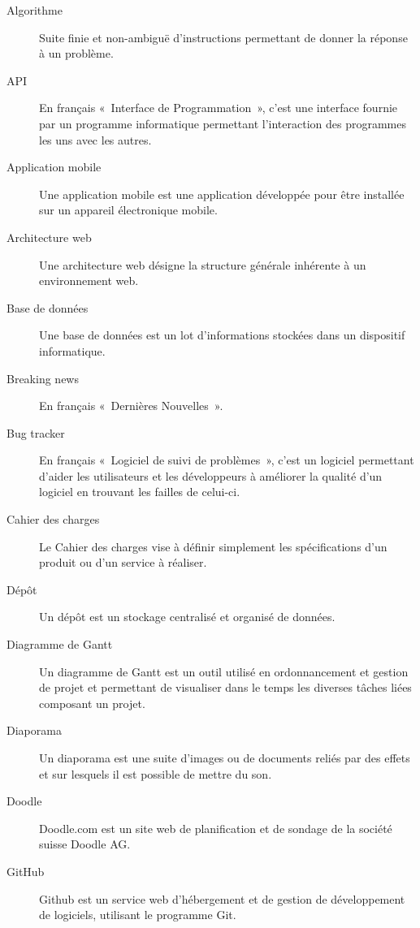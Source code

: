 \documentclass{life-fr}
\begin{document}
\begin{description}
\item[Algorithme]
Suite finie et non-ambiguë d’instructions permettant de donner la réponse à un problème.
\item[API]
En français «~Interface de Programmation~», c'est une interface fournie par un programme informatique permettant l'interaction des programmes les uns avec les autres.

\item[Application mobile]
Une application mobile est une application développée pour être installée sur un appareil électronique mobile.

\item[Architecture web]
Une architecture web désigne la structure générale inhérente à un environnement web.

\item[Base de données]
Une base de données est un lot d'informations stockées dans un dispositif informatique.

\item[Breaking news]
En français «~Dernières Nouvelles~».

\item[Bug tracker]
En français «~Logiciel de suivi de problèmes~», c'est un logiciel permettant d'aider les utilisateurs et les développeurs à améliorer la qualité d'un logiciel en trouvant les failles de celui-ci.

\item[Cahier des charges]
Le Cahier des charges vise à définir simplement les spécifications d’un produit ou d’un service à réaliser.

\item[Dépôt]
Un dépôt est un stockage centralisé et organisé de données.

\item[Diagramme de Gantt]
Un diagramme de Gantt est un outil utilisé en ordonnancement et gestion de projet et permettant de visualiser dans le temps les diverses tâches liées composant un projet.

\item[Diaporama]
Un diaporama est une suite d’images ou de documents reliés par des effets et sur lesquels il est possible de mettre du son.

\item[Doodle]
Doodle.com est un site web de planification et de sondage de la société suisse Doodle AG.

\item[GitHub]
Github est un service web d'hébergement et de gestion de développement de logiciels, utilisant le programme Git.


\end{description}
\end{document}
